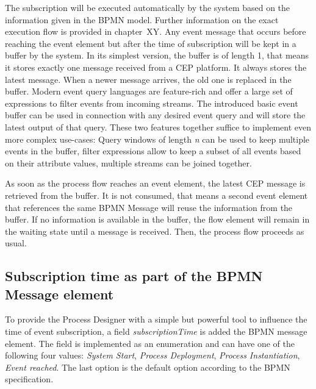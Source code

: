 The subscription will be executed automatically by the system based on the information given in the BPMN model. Further information on the exact execution flow is provided in chapter~XY. 
Any event message that occurs before reaching the event element but after the time of subscription will be kept in a buffer by the system.
In its simplest version, the buffer is of length 1, that means it stores exactly one message received from a CEP platform. It always stores the latest message. When a newer message arrives, the old one is replaced in the buffer.
Modern event query languages are feature-rich and offer a large set of expressions to filter events from incoming streams. 
The introduced basic event buffer can be used in connection with any desired event query and will store the latest output of that query.
These two features together suffice to implement even more complex use-cases: Query windows of length \textit{n} can be used to keep multiple events in the buffer, filter expressions allow to keep a subset of all events based on their attribute values, multiple streams can be joined together.

As soon as the process flow reaches an event element, the latest CEP message is retrieved from the buffer. It is not consumed, that means a second event element that references the same BPMN Message will reuse the information from the buffer.
If no information is available in the buffer, the flow element will remain in the waiting state until a message is received. Then, the process flow proceeds as usual.


\subsection{Subscription time as part of the BPMN Message element}
To provide the Process Designer with a simple but powerful tool to influence the time of event subscription, a field \textit{subscriptionTime} is added the BPMN message element. 
The field is implemented as an enumeration and can have one of the following four values: \textit{System Start}, \textit{Process Deployment}, \textit{Process Instantiation}, \textit{Event reached}. The last option is the default option according to the BPMN specification.

